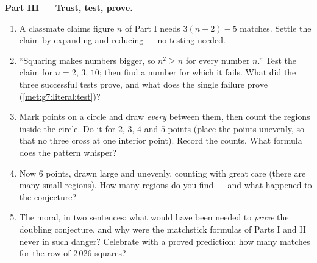 \begin{problem}
\medskip
\noindent\textbf{Part III --- Trust, test, prove.}
\begin{enumerate}[resume]
  \item A classmate claims figure $n$ of Part I needs
        $3(n + 2) - 5$ matches. Settle the claim by expanding and
        reducing --- no testing needed.
  \item ``Squaring makes numbers bigger, so $n^2 \geq n$ for
        every number $n$.'' Test the claim for $n = 2$, $3$,
        $10$; then find a number for which it fails. What did the
        three successful tests prove, and what does the single
        failure prove (\cref{met:g7:literal:test})?
  \item Mark points on a circle and draw \emph{every} 
        between them, then count the regions inside the circle.
        Do it for $2$, $3$, $4$ and $5$ points (place the points
        unevenly, so that no three  cross at one interior
        point). Record the counts. What formula does the pattern
        whisper?
  \item Now $6$ points, drawn large and unevenly, counting with
        great care (there are many small regions). How many
        regions do you find --- and what happened to the
        conjecture?
  \item The moral, in two sentences: what would have been needed
        to \emph{prove} the doubling conjecture, and why were the
        matchstick formulas of Parts I and II never in such
        danger? Celebrate with a proved prediction: how many
        matches for the row of $2\,026$ squares?
\end{enumerate}
\end{problem}
